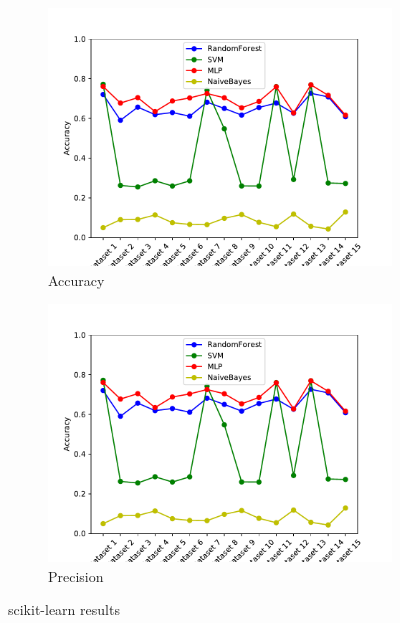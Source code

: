 \begin{figure}[H]
\centering
\begin{subfigure}[t]{0.475\textwidth}
    \centering
    \includegraphics[page=1, width=\linewidth]{images/results_scikit.pdf}
    \caption{Accuracy}
    \label{fig:scikit_accuracy}
\end{subfigure}
\begin{subfigure}[t]{0.475\textwidth}
    \centering
    \includegraphics[page=3, width=\linewidth]{images/results_scikit.pdf}
    \caption{Precision}
    \label{fig:scikit_prec}
\end{subfigure}
\caption{scikit-learn results}
\end{figure}

